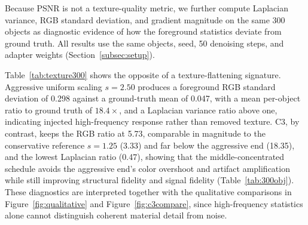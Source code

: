 \documentclass[times,twocolumn,final]{elsarticle}
\begin{document}
Because PSNR is not a texture-quality metric, we further compute Laplacian variance, RGB standard deviation, and gradient magnitude on the same 300 objects as diagnostic evidence of how the foreground statistics deviate from ground truth. All results use the same objects, seed, 50 denoising steps, and adapter weights (Section~\ref{subsec:setup}).

\begin{table}[t]
\centering
\caption{Foreground texture diagnostics on the same 300 objects (Section~\ref{subsec:setup}). Values are foreground mean absolute statistics; the last three columns are the mean over objects of each per-object ratio to the corresponding ground-truth statistic (equal object weighting). Aggressive uniform scaling $s = 2.50$ blows up the RGB standard deviation ratio to ground truth to $18.4\times$ on average (vs.\ $3.3\times$ for $s = 1.25$), consistent with color overshoot and high-frequency artifact amplification rather than texture flattening. C3 keeps the RGB ratio comparable in magnitude to the conservative reference ($5.7\times$ vs.\ $3.3\times$) and far below the aggressive end, while retaining higher structural fidelity (Table~\ref{tab:300obj}).}
\label{tab:texture300}
\small
{}
\end{table}

Table~\ref{tab:texture300} shows the opposite of a texture-flattening signature. Aggressive uniform scaling $s = 2.50$ produces a foreground RGB standard deviation of 0.298 against a ground-truth mean of 0.047, with a mean per-object ratio to ground truth of $18.4\times$, and a Laplacian variance ratio above one, indicating injected high-frequency response rather than removed texture. C3, by contrast, keeps the RGB ratio at 5.73, comparable in magnitude to the conservative reference $s = 1.25$ (3.33) and far below the aggressive end (18.35), and the lowest Laplacian ratio (0.47), showing that the middle-concentrated schedule avoids the aggressive end's color overshoot and artifact amplification while still improving structural fidelity and signal fidelity (Table~\ref{tab:300obj}). These diagnostics are interpreted together with the qualitative comparisons in Figure~\ref{fig:qualitative} and Figure~\ref{fig:c3compare}, since high-frequency statistics alone cannot distinguish coherent material detail from noise.
\end{document}
